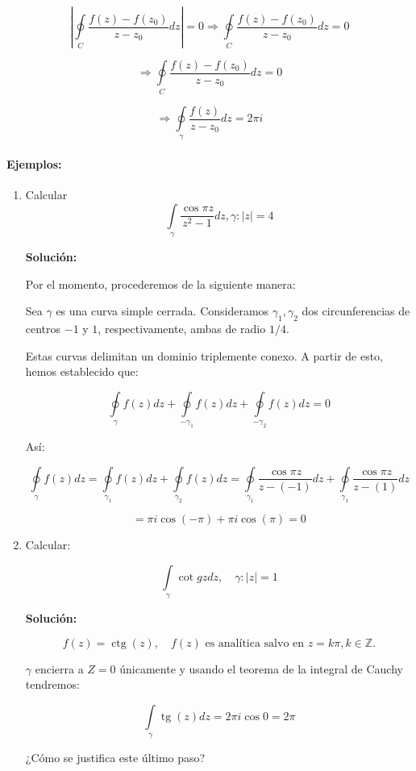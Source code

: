 \documentclass[a4paper,12pt]{article}
\begin{document}
\[
\left| \oint\limits_{C} \frac{f(z) - f(z_0)}{z - z_0} dz \right| = 0 \Rightarrow \oint\limits_{C} \frac{f(z) - f(z_0)}{z - z_0} dz = 0
\]

\[
\Rightarrow \oint\limits_{C} \frac{f(z) - f(z_0)}{z - z_0} dz = 0
\]

\[
\Rightarrow \oint\limits_{\gamma} \frac{f(z)}{z - z_0} dz = 2\pi i
\]

\paragraph{Ejemplos:}

\begin{enumerate}
    \item Calcular \[\int\limits_{\gamma} \frac{\cos \pi z}{z^2 - 1} dz, \gamma : |z| = 4\]

\textbf{Solución:}

Por el momento, procederemos de la siguiente manera:

Sea $\gamma$ es una curva simple cerrada. Consideramos $\gamma_1, \gamma_2$ dos circunferencias de centros $-1$ y $1$, respectivamente, ambas de radio $1/4$.

Estas curvas delimitan un dominio triplemente conexo. A partir de esto, hemos establecido que:


\[
\oint\limits_{\gamma} f(z)dz + \oint\limits_{-\gamma_1} f(z)dz + \oint\limits_{-\gamma_2} f(z)dz = 0
\]

Así:

\[
\oint\limits_{\gamma} f(z)dz = \oint\limits_{\gamma_1} f(z)dz + \oint\limits_{\gamma_2} f(z)dz = \oint\limits_{\gamma_1} \frac{\cos \pi z}{z - (-1)} dz + \oint\limits_{\gamma_1} \frac{\cos \pi z}{z - (1)} dz
\]

\[
= \pi i \cos(-\pi) + \pi i \cos(\pi) = 0
\]

\item  Calcular:

\[
\int\limits_{\gamma} \cot gz dz, \quad \gamma : |z| = 1
\]

\textbf{Solución:}

\[
f(z) = \operatorname{ctg}(z), \quad f(z) \text{ es analítica salvo en } z = k\pi, k \in \mathbb{Z}.
\]

$\gamma$ encierra a $Z = 0$ únicamente y usando el teorema de la integral de Cauchy tendremos:

\[
\int\limits_{\gamma} \operatorname{tg}(z)dz = 2\pi i \cos 0 = 2\pi
\]

¿Cómo se justifica este último paso?
\end{enumerate}
\end{document}
